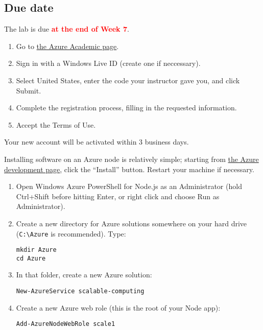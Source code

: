 \documentclass{article}
\newcommand{\labduedate}{at the end of Week 7}
\begin{document}
\subsection*{Due date}
The lab is due \textcolor{red}{\textbf{\labduedate}}.




\begin{enumerate}
\item Go to \href{http://www.WindowsAzurePass.com/Academic}{the Azure Academic page}.
\item Sign in with a Windows Live ID (create one if neccessary).
\item Select United States, enter the code your instructor gave you, and click Submit.
\item Complete the registration process, filling in the requested information.
\item Accept the Terms of Use.
\end{enumerate}

Your new account will be activated within 3 business days.


Installing software on an Azure node is relatively simple; starting from \href{http://www.windowsazure.com/en-us/develop/nodejs/}{the Azure development page}, click the ``Install'' button. Restart your machine if necessary.


\begin{enumerate}
\item Open Windows Azure PowerShell for Node.js as an Administrator (hold Ctrl+Shift before hitting Enter, or right click and choose Run as Administrator).
\item Create a new directory for Azure solutions somewhere on your hard drive (\verb!C:\Azure! is recommended). Type:
\begin{verbatim}
mkdir Azure
cd Azure
\end{verbatim}
\item In that folder, create a new Azure solution:
\begin{verbatim}
New-AzureService scalable-computing
\end{verbatim}
\item Create a new Azure web role (this is the root of your Node app):
\begin{verbatim}
Add-AzureNodeWebRole scale1
\end{verbatim}
\end{enumerate}
\end{document}
